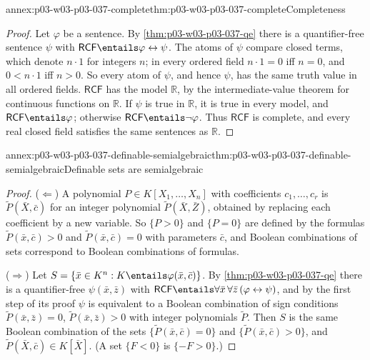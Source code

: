 \begin{annexitem}{annex:p03-w03-p03-037-complete}{thm:p03-w03-p03-037-complete}{Completeness}
\begin{proof}
Let \(\varphi\) be a sentence.  By \cref{thm:p03-w03-p03-037-qe} there is a
quantifier-free sentence \(\psi\) with
\(\mathsf{RCF}\entails\varphi\leftrightarrow\psi\).  The atoms of \(\psi\)
compare closed terms, which denote \(n\cdot1\) for integers \(n\); in every
ordered field \(n\cdot1=0\) iff \(n=0\), and \(0<n\cdot1\) iff \(n>0\).  So
every atom of \(\psi\), and hence \(\psi\), has the same truth value in all
ordered fields.  \(\mathsf{RCF}\) has the model \(\mathbb R\), by the
intermediate-value theorem for continuous functions on \(\mathbb R\).  If
\(\psi\) is true in \(\mathbb R\), it is true in every model, and
\(\mathsf{RCF}\entails\varphi\); otherwise \(\mathsf{RCF}\entails\neg\varphi\).
Thus \(\mathsf{RCF}\) is complete, and every real closed field satisfies the
same sentences as \(\mathbb R\).
\end{proof}
\end{annexitem}

\begin{annexitem}{annex:p03-w03-p03-037-definable-semialgebraic}{thm:p03-w03-p03-037-definable-semialgebraic}{Definable sets are semialgebraic}
\begin{proof}
(\(\Leftarrow\)) A polynomial \(P\in K[X_1,\dots,X_n]\) with coefficients
\(c_1,\dots,c_r\) is \(\tilde P(\bar X,\bar c)\) for an integer polynomial
\(\tilde P(\bar X,\bar Z)\), obtained by replacing each coefficient by a new
variable.  So \(\{P>0\}\) and \(\{P=0\}\) are defined by the formulas
\(\tilde P(\bar x,\bar c)>0\) and \(\tilde P(\bar x,\bar c)=0\) with
parameters \(\bar c\), and Boolean combinations of sets correspond to
Boolean combinations of formulas.

(\(\Rightarrow\)) Let \(S=\{\bar x\in K^n:K\entails\varphi(\bar x,\bar c)\}\).
By \cref{thm:p03-w03-p03-037-qe} there is a quantifier-free
\(\psi(\bar x,\bar z)\) with
\(\mathsf{RCF}\entails\forall\bar x\,\forall\bar z\,(\varphi\leftrightarrow\psi)\),
and by the first step of its proof \(\psi\) is equivalent to a Boolean
combination of sign conditions \(\tilde P(\bar x,\bar z)=0\),
\(\tilde P(\bar x,\bar z)>0\) with integer polynomials \(\tilde P\).  Then
\(S\) is the same Boolean combination of the sets
\(\{\tilde P(\bar x,\bar c)=0\}\) and \(\{\tilde P(\bar x,\bar c)>0\}\), and
\(\tilde P(\bar X,\bar c)\in K[\bar X]\).  (A set \(\{F<0\}\) is
\(\{-F>0\}\).)
\end{proof}
\end{annexitem}


